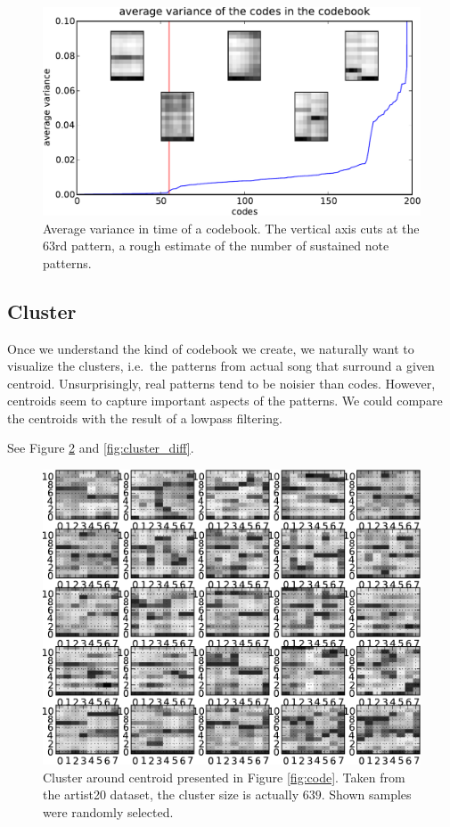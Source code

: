 \documentclass{article}
\newcommand{\ie}{i.e.~}
\begin{document}
\begin{figure}[htb]
\begin{center}
\includegraphics[width=.9\columnwidth]{code_variance}
\end{center}
\caption{\small{Average variance in time of a codebook. The vertical
axis cuts at the $63$rd pattern, a rough estimate of the number of 
sustained note patterns.
}}
\label{fig:code_var}
\end{figure}

\subsection{Cluster}
Once we understand the kind of codebook we create, we naturally want
to visualize the clusters, \ie the patterns from actual song that
surround a given centroid. Unsurprisingly, real patterns tend to be
noisier than codes. However, centroids seem to capture important aspects
of the patterns. We could compare the centroids with the result of
a lowpass filtering.

See Figure \ref{fig:cluster} and \ref{fig:cluster_diff}.

\begin{figure}[htb]
\begin{center}
\includegraphics[width=.9\columnwidth]{close_patterns1}
\end{center}
\caption{\small{Cluster around centroid presented in
Figure \ref{fig:code}. Taken from the artist20 dataset, the cluster
size is actually $639$. Shown samples were randomly selected.
}}
\label{fig:cluster}
\end{figure}
\end{document}
